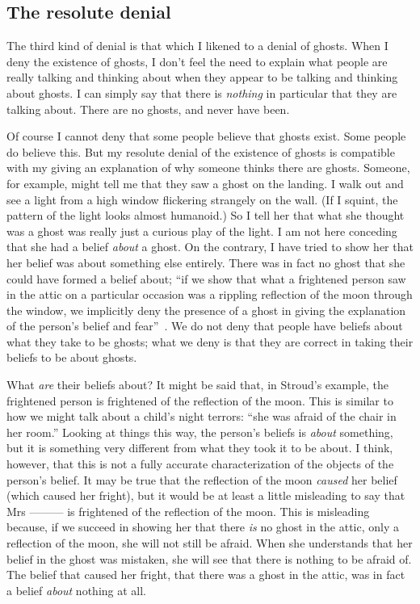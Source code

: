 \documentclass[11pt]{article}
\begin{document}
\begin{spacing}{1.5}
\subsection{The resolute denial}
\label{resolute}
The third kind of denial is that which I likened to a denial of ghosts. When I deny the existence of ghosts, I don't feel the need to explain what people are really talking and thinking about when they appear to be talking and thinking about ghosts. I can simply say that there is {\em nothing} in particular that they are talking about. There are no ghosts, and never have been.

Of course I cannot deny that some people believe that ghosts exist. Some people do believe this. But my resolute denial of the existence of ghosts is compatible with my giving an explanation of why someone thinks there are ghosts. Someone, for example, might tell me that they saw a ghost on the landing. I walk out and see a light from a high window flickering strangely on the wall. (If I squint, the pattern of the light looks almost humanoid.) So I tell her that what she thought was a ghost was really just a curious play of the light. I am not here conceding that she had a belief {\em about} a ghost. On the contrary, I have tried to show her that her belief was about something else entirely. There was in fact no ghost that she could have formed a belief about; ``if we show that what a frightened person saw in the attic on a particular occasion was a rippling reflection of the moon through the window, we implicitly deny the presence of a ghost in giving the explanation of the person's belief and fear''~\citep[76]{stroud2000a}. We do not deny that people have beliefs about what they take to be ghosts; what we deny is that they are correct in taking their beliefs to be about ghosts.

What {\em are} their beliefs about? It might be said that, in Stroud's example, the frightened person is frightened of the reflection of the moon. This is similar to how we might talk about a child's night terrors: ``she was afraid of the chair in her room.'' Looking at things this way, the person's beliefs is {\em about} something, but it is something very different from what they took it to be about. I think, however, that this is not a fully accurate characterization of the objects of the person's belief. It may be true that the reflection of the moon {\em caused} her belief (which caused her fright), but it would be at least a little misleading to say that Mrs --------- is frightened of the reflection of the moon. This is misleading because, if we succeed in showing her that there {\em is} no ghost in the attic, only a reflection of the moon, she will not still be afraid. When she understands that her belief in the ghost was mistaken, she will see that there is nothing to be afraid of. The belief that caused her fright, that there was a ghost in the attic, was in fact a belief {\em about} nothing at all.


\end{spacing}
\end{document}
